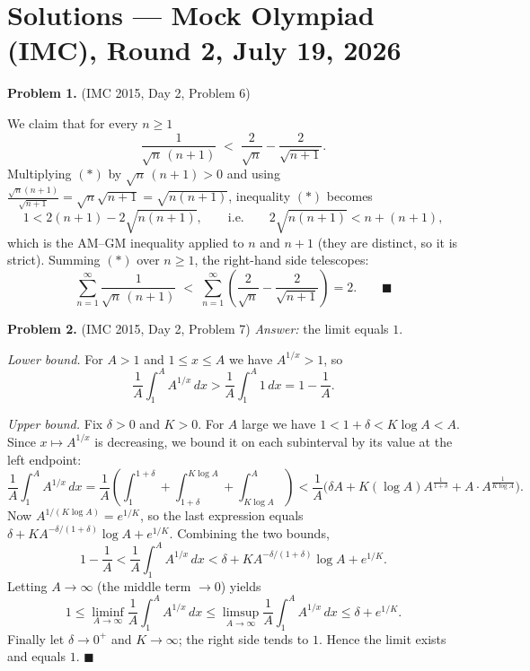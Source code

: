 \documentclass{article}
\begin{document}
\pagestyle{plain}

\section*{Solutions --- Mock Olympiad (IMC), Round 2, July 19, 2026}

\bigskip

\noindent\textbf{Problem 1.} (IMC 2015, Day 2, Problem 6)

\medskip
\noindent We claim that for every \( n \geq 1 \)
\[
\frac{1}{\sqrt{n}\,(n+1)} \;<\; \frac{2}{\sqrt{n}} - \frac{2}{\sqrt{n+1}}. \tag{$\ast$}
\]
Multiplying $(\ast)$ by \( \sqrt{n}\,(n+1) > 0 \) and using \( \tfrac{\sqrt{n}(n+1)}{\sqrt{n+1}} = \sqrt{n}\sqrt{n+1} = \sqrt{n(n+1)} \), inequality $(\ast)$ becomes
\[
1 < 2(n+1) - 2\sqrt{n(n+1)}, \qquad \text{i.e.} \qquad 2\sqrt{n(n+1)} < n + (n+1),
\]
which is the AM--GM inequality applied to \( n \) and \( n+1 \) (they are distinct, so it is strict). Summing $(\ast)$ over \( n \geq 1 \), the right-hand side telescopes:
\[
\sum_{n=1}^{\infty} \frac{1}{\sqrt{n}\,(n+1)} \;<\; \sum_{n=1}^{\infty} \left( \frac{2}{\sqrt{n}} - \frac{2}{\sqrt{n+1}} \right) = 2. \qquad \blacksquare
\]

\bigskip

\noindent\textbf{Problem 2.} (IMC 2015, Day 2, Problem 7)
\quad \textit{Answer: } the limit equals \( 1 \).

\medskip
\noindent \emph{Lower bound.} For \( A > 1 \) and \( 1 \leq x \leq A \) we have \( A^{1/x} > 1 \), so
\[
\frac{1}{A} \int_1^A A^{1/x}\, dx > \frac{1}{A} \int_1^A 1\, dx = 1 - \frac{1}{A}.
\]

\emph{Upper bound.} Fix \( \delta > 0 \) and \( K > 0 \). For \( A \) large we have \( 1 < 1 + \delta < K \log A < A \). Since \( x \mapsto A^{1/x} \) is decreasing, we bound it on each subinterval by its value at the left endpoint:
\[
\frac{1}{A}\int_1^A A^{1/x}\,dx
= \frac{1}{A}\left( \int_1^{1+\delta} + \int_{1+\delta}^{K\log A} + \int_{K\log A}^{A} \right)
< \frac{1}{A}\Big( \delta A + K(\log A) A^{\frac{1}{1+\delta}} + A\cdot A^{\frac{1}{K\log A}} \Big).
\]
Now \( A^{1/(K\log A)} = e^{1/K} \), so the last expression equals \( \delta + K A^{-\delta/(1+\delta)}\log A + e^{1/K} \). Combining the two bounds,
\[
1 - \frac{1}{A} < \frac{1}{A}\int_1^A A^{1/x}\,dx < \delta + K A^{-\delta/(1+\delta)}\log A + e^{1/K}.
\]
Letting \( A \to \infty \) (the middle term \( \to 0 \)) yields
\[
1 \leq \liminf_{A\to\infty} \frac{1}{A}\int_1^A A^{1/x}\,dx \leq \limsup_{A\to\infty} \frac{1}{A}\int_1^A A^{1/x}\,dx \leq \delta + e^{1/K}.
\]
Finally let \( \delta \to 0^+ \) and \( K \to \infty \); the right side tends to \( 1 \). Hence the limit exists and equals \( 1 \). \hfill\( \blacksquare \)
\end{document}
